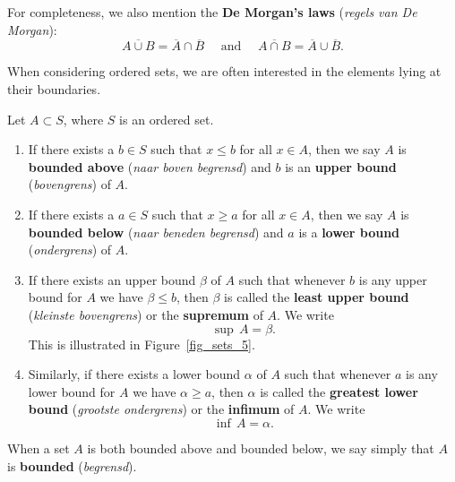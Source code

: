 For completeness, we also mention the \textbf{De Morgan's laws} (\textit{regels van De Morgan}):
$$
\overline{A\cup B}=\overline{A}\cap\overline{B} \quad\mbox{ and }\quad\overline{A\cap B}=\overline{A}\cup\overline{B}.
$$

\ifcourse
\ifanalysis

	When considering ordered sets, we are often interested in the elements lying at their  boundaries.\\
	
	\begin{definition}
		\label{sup_def}
		Let $A \subset S$, where $S$ is an ordered set.
		
		\begin{enumerate}
			\item If there exists a $b \in S$ such that $x \leq b$ for all $x \in A$, then we say $A$ is \textbf{bounded above} (\textit{naar boven begrensd}) and $b$
			is an \textbf{upper bound} (\textit{bovengrens}) of $A$.
			\item If there exists a $a \in S$ such that $x \geq a$ for all $x \in A$,
			then we say $A$ is \textbf{bounded below} (\textit{naar beneden begrensd}) and $a$
			is a \textbf{lower bound} (\textit{ondergrens}) of $A$.
			\item If there exists an upper bound $\beta$ of $A$ such that whenever
			$b$ is any upper bound for $A$ we have $\beta \leq b$, then $\beta$
			is called the \textbf{least upper bound} (\textit{kleinste bovengrens}) or
			the \textbf{supremum}
			of $A$.    We write
			\begin{equation*}
			\sup\, A = \beta .
			\end{equation*}
			This is illustrated in Figure~\ref{fig_sets_5}.
			\item Similarly, if there exists a lower bound $\alpha$ of $A$ such that whenever
			$a$ is any lower bound for $A$ we have $\alpha \geq a$, then $\alpha$
			is called the \textbf{greatest lower bound} (\textit{grootste ondergrens}) or
			the \textbf{infimum}
			of $A$.  We write
			\begin{equation*}
			\inf\, A = \alpha  .
			\end{equation*}
		\end{enumerate}
		When a set $A$ is both bounded above and bounded below, we say simply that
		$A$ is \textbf{bounded} (\textit{begrensd}).
	\end{definition}


